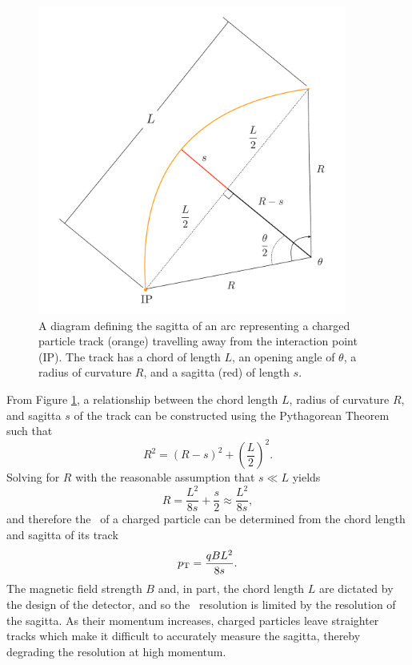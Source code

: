 \begin{figure}[htbp]
  \centering
    \includegraphics[width=4in]{images/sagitta}
    \caption[Sagitta of a Charged Particle Track]{A diagram defining the sagitta of an arc representing a charged particle track (orange) travelling away from the interaction point (IP). The track has a chord of length $L$, an opening angle of $\theta$, a radius of curvature $R$, and a sagitta (red) of length $s$.}
    \label{fig:sagitta}
\end{figure}

From Figure \ref{fig:sagitta}, a relationship between the chord length $L$, radius of curvature $R$, and sagitta $s$ of the track can be constructed using the Pythagorean Theorem such that
\begin{equation}
  R^{2} = \left( R - s \right)^{2} + \left( \frac{L}{2} \right)^{2}.
\end{equation}
Solving for $R$ with the reasonable assumption that $s \ll L$ yields
\begin{equation}
  R = \frac{L^{2}}{8s} + \frac{s}{2} \approx \frac{L^{2}}{8s},
\end{equation}
and therefore the \pT\ of a charged particle can be determined from the chord length and sagitta of its track
\begin{equation}
  p_{\mathrm{T}} = \frac{qBL^{2}}{8s}.
\end{equation}
The magnetic field strength $B$ and, in part, the chord length $L$ are dictated by the design of the detector, and so the \pT\ resolution is limited by the resolution of the sagitta. As their momentum increases, charged particles leave straighter tracks which make it difficult to accurately measure the sagitta, thereby degrading the resolution at high momentum.

